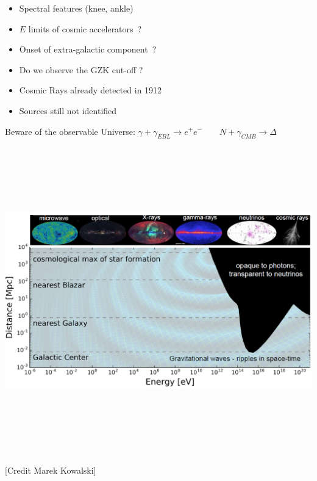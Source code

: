 \newpage

\vspace*{3cm}
\begin{itemize}
\item Spectral features (knee, ankle)
\item[] $E$ limits of cosmic accelerators~?
\item[] Onset of extra-galactic component~?
\item[] Do we observe the GZK cut-off ?
\item Cosmic Rays already detected in 1912
\item[] {\blue Sources still not identified}
\end{itemize}

\Tr
\onecolumn
\begin{center}
{\blue Beware of the observable Universe:
 $\gamma+\gamma_{EBL}\rightarrow e^{+}e^{-} \qquad N+\gamma_{CMB} \rightarrow \Delta$}\\
\includegraphics[keepaspectratio,height=14cm]{marek}\\
{\large [Credit Marek Kowalski]}
\end{center}

